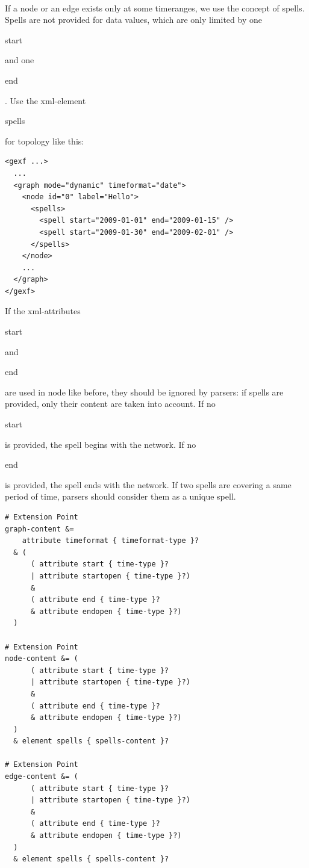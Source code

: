 \documentclass[a4paper,10pt]{article}
\begin{document}
\paragraph{}
If a node or an edge exists only at some timeranges, we use the concept of spells. Spells are not provided for data values, which are only limited by one \begin{footnotesize}start\end{footnotesize} and one \begin{footnotesize}end\end{footnotesize}. Use the xml-element \begin{footnotesize}spells\end{footnotesize} for topology like this:

\lstset{ style=gexf }
\begin{lstlisting}[caption={Node with multiple spells}]
<gexf ...>
  ...
  <graph mode="dynamic" timeformat="date">
    <node id="0" label="Hello">
      <spells>
        <spell start="2009-01-01" end="2009-01-15" />
        <spell start="2009-01-30" end="2009-02-01" />
      </spells>
    </node>
    ...
  </graph>
</gexf>
\end{lstlisting}

If the xml-attributes \begin{footnotesize}start\end{footnotesize} and \begin{footnotesize}end\end{footnotesize} are used in node like before, they should be ignored by parsers: if spells are provided, only their content are taken into account. If no \begin{footnotesize}start\end{footnotesize} is provided, the spell begins with the network. If no \begin{footnotesize}end\end{footnotesize} is provided, the spell ends with the network. If two spells are covering a same period of time, parsers should consider them as a unique spell.

\lstset{ style=rnc }
\begin{lstlisting}[caption={Dynamic Topology Specification},label=dyntopoRNC]
# Extension Point
graph-content &=
    attribute timeformat { timeformat-type }?
  & (
      ( attribute start { time-type }?
      | attribute startopen { time-type }?)
      &
      ( attribute end { time-type }?
      & attribute endopen { time-type }?)
  )

# Extension Point
node-content &= (
      ( attribute start { time-type }?
      | attribute startopen { time-type }?)
      &
      ( attribute end { time-type }?
      & attribute endopen { time-type }?)
  )
  & element spells { spells-content }?

# Extension Point
edge-content &= (
      ( attribute start { time-type }?
      | attribute startopen { time-type }?)
      &
      ( attribute end { time-type }?
      & attribute endopen { time-type }?)
  )
  & element spells { spells-content }?
\end{lstlisting}
\end{document}
